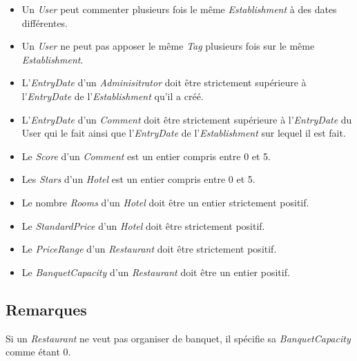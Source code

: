 \documentclass[11pt,a4paper]{report}
\begin{document}
\begin{itemize}
\item Un \textit{User} peut commenter plusieurs fois le même \textit{Establishment} à des dates différentes. 
\item Un \textit{User} ne peut pas apposer le même \textit{Tag} plusieurs fois sur le même \textit{Establishment}.
\item L'\textit{EntryDate} d'un \textit{Adminisitrator} doit être strictement supérieure à l'\textit{EntryDate} de l'\textit{Establishment} qu'il a créé.
\item L'\textit{EntryDate} d'un \textit{Comment} doit être strictement supérieure à l'\textit{EntryDate} du User qui le fait ainsi que l'\textit{EntryDate} de l'\textit{Establishment} sur lequel il est fait. 
\item Le \textit{Score} d'un \textit{Comment} est un entier compris entre 0 et 5.
\item Les \textit{Stars} d'un \textit{Hotel} est un entier compris entre 0 et 5.
\item Le nombre \textit{Rooms} d'un \textit{Hotel} doit être un entier strictement positif. 
\item Le \textit{StandardPrice} d'un \textit{Hotel} doit être strictement positif. 
\item Le \textit{PriceRange} d'un \textit{Restaurant} doit être strictement positif. 
\item Le \textit{BanquetCapacity} d'un \textit{Restaurant} doit être un entier positif. 
\end{itemize}
\subsection*{Remarques}
Si un \textit{Restaurant} ne veut pas organiser de banquet, il spécifie sa \textit{BanquetCapacity} comme étant 0.
\end{document}
